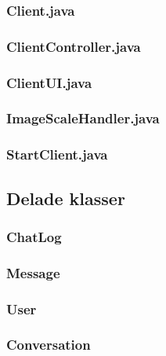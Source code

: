 \documentclass[a4paper,11pt]{article}
\begin{document}
		\subsubsection{Client.java}
		
		\subsubsection{ClientController.java}
		
		\subsubsection{ClientUI.java}
		
		\subsubsection{ImageScaleHandler.java}
		
		\subsubsection{StartClient.java}
		

	\subsection{Delade klasser}
		\subsubsection{ChatLog}
			
			\subsubsection{Message}
			
			\subsubsection{User}
			
			\subsubsection{Conversation}
			








	
\end{document}

